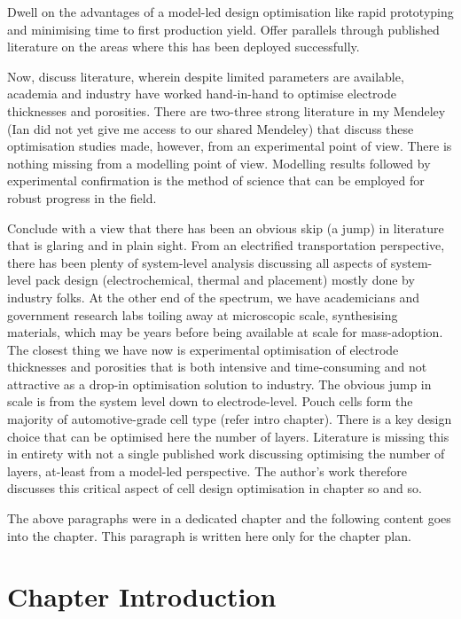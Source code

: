 Dwell  on  the  advantages  of   a  model-led  design  optimisation  like  rapid
prototyping  and minimising  time  to first  production  yield. Offer  parallels
through  published  literature  on  the  areas  where  this  has  been  deployed
successfully.

Now,  discuss  literature, wherein  despite  limited  parameters are  available,
academia and industry have worked hand-in-hand to optimise electrode thicknesses
and  porosities. There  are  two-three  strong literature  in  my Mendeley  (Ian
did  not  yet  give  me  access  to our  shared  Mendeley)  that  discuss  these
optimisation studies made, however, from an experimental point of view. There is
nothing missing  from a modelling point  of view. Modelling results  followed by
experimental confirmation  is the  method of  science that  can be  employed for
robust progress in the field.

Conclude with a view that there has  been an obvious skip (a jump) in literature
that  is  glaring  and  in  plain  sight.  From  an  electrified  transportation
perspective,  there has  been  plenty of  system-level  analysis discussing  all
aspects  of system-level  pack design  (electrochemical, thermal  and placement)
mostly  done by  industry folks.  At  the other  end  of the  spectrum, we  have
academicians and  government research  labs toiling  away at  microscopic scale,
synthesising materials, which  may be years before being available  at scale for
mass-adoption. The  closest thing  we have now  is experimental  optimisation of
electrode thicknesses and  porosities that is both  intensive and time-consuming
and not attractive  as a drop-in optimisation solution to  industry. The obvious
jump in scale is from the system level down to electrode-level. Pouch cells form
the majority of automotive-grade cell type (refer intro chapter). There is a key
design choice that can be optimised here \viz{} the number of layers. Literature
is  missing  this in  entirety  with  not  a  single published  work  discussing
optimising  the  number  of  layers,  at-least  from  a  model-led  perspective.
The  author's work  therefore  discusses  this critical  aspect  of cell  design
optimisation in chapter so and so.


The above paragraphs were in a  dedicated chapter and the following content goes
into the chapter. This paragraph is written here only for the chapter plan.

\section{Chapter Introduction}


